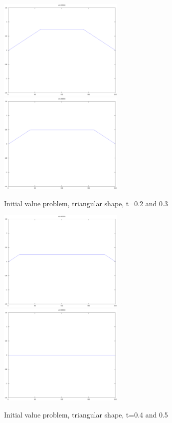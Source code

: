 \documentclass[a4paper,10pt]{report}
\begin{document}
\begin{figure}
 \includegraphics[width=6cm]{./fixed_ends_analytic_t0.200000.eps}
\includegraphics[width=6cm]{./fixed_ends_analytic_t0.300000.eps}

\caption{Initial value problem, triangular shape, t=0.2 and 0.3}
\end{figure} 

\begin{figure}
 \includegraphics[width=6cm]{./fixed_ends_analytic_t0.400000.eps}
\includegraphics[width=6cm]{./fixed_ends_analytic_t0.500000.eps}

\caption{Initial value problem, triangular shape, t=0.4 and 0.5}
\end{figure}
 
\end{document}
